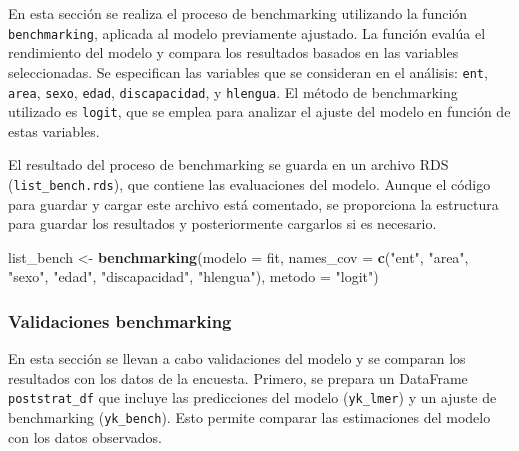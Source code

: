 \documentclass[
  12pt,
]{book}
\newenvironment{Shaded}{\begin{snugshade}}{\end{snugshade}}
\newcommand{\AttributeTok}[1]{\textcolor[rgb]{0.13,0.29,0.53}{#1}}
\newcommand{\FunctionTok}[1]{\textcolor[rgb]{0.13,0.29,0.53}{\textbf{#1}}}
\newcommand{\NormalTok}[1]{#1}
\newcommand{\OtherTok}[1]{\textcolor[rgb]{0.56,0.35,0.01}{#1}}
\newcommand{\StringTok}[1]{\textcolor[rgb]{0.31,0.60,0.02}{#1}}
\begin{document}
En esta sección se realiza el proceso de benchmarking utilizando la función \texttt{benchmarking}, aplicada al modelo previamente ajustado. La función evalúa el rendimiento del modelo y compara los resultados basados en las variables seleccionadas. Se especifican las variables que se consideran en el análisis: \texttt{ent}, \texttt{area}, \texttt{sexo}, \texttt{edad}, \texttt{discapacidad}, y \texttt{hlengua}. El método de benchmarking utilizado es \texttt{logit}, que se emplea para analizar el ajuste del modelo en función de estas variables.

El resultado del proceso de benchmarking se guarda en un archivo RDS (\texttt{list\_bench.rds}), que contiene las evaluaciones del modelo. Aunque el código para guardar y cargar este archivo está comentado, se proporciona la estructura para guardar los resultados y posteriormente cargarlos si es necesario.

\begin{Shaded}
\begin{Highlighting}[]
\NormalTok{list\_bench }\OtherTok{\textless{}{-}} \FunctionTok{benchmarking}\NormalTok{(}\AttributeTok{modelo =}\NormalTok{ fit,}
             \AttributeTok{names\_cov =}   \FunctionTok{c}\NormalTok{(}\StringTok{"ent"}\NormalTok{,}
                             \StringTok{"area"}\NormalTok{,}
                             \StringTok{"sexo"}\NormalTok{,}
                             \StringTok{"edad"}\NormalTok{,}
                             \StringTok{"discapacidad"}\NormalTok{,}
                             \StringTok{"hlengua"}\NormalTok{),                      }
             \AttributeTok{metodo =} \StringTok{"logit"}\NormalTok{)}
\end{Highlighting}
\end{Shaded}

\hypertarget{validaciones-benchmarking-2}{%
\subsubsection*{Validaciones benchmarking}\label{validaciones-benchmarking-2}}

En esta sección se llevan a cabo validaciones del modelo y se comparan los resultados con los datos de la encuesta. Primero, se prepara un DataFrame \texttt{poststrat\_df} que incluye las predicciones del modelo (\texttt{yk\_lmer}) y un ajuste de benchmarking (\texttt{yk\_bench}). Esto permite comparar las estimaciones del modelo con los datos observados.
\end{document}
